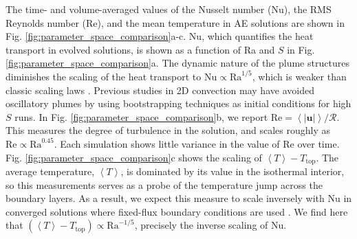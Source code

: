 \documentclass[aps, pre, onecolumn, nofootinbib, notitlepage, groupedaddress, amsfonts, amssymb, amsmath, longbibliography]{revtex4-1}
\newcommand{\angles}[1]{\ensuremath{\left\langle #1 \right\rangle}}
\begin{document}
The time- and volume-averaged values of the Nusselt number (Nu), the RMS
Reynolds number (Re), and the mean temperature in AE solutions 
are shown in Fig. \ref{fig:parameter_space_comparison}a-c.
Nu, which quantifies the heat transport in evolved solutions,
is shown as a function of Ra and $S$ in Fig. \ref{fig:parameter_space_comparison}a.
The
dynamic nature of the plume structures diminishes the
scaling of the heat transport to $\text{Nu} \propto \text{Ra}^{1/5}$,
which is weaker than classic scaling laws \cite{johnston&doering2009, ahlers&all2009}.
Previous studies in 2D convection may have avoided oscillatory plumes by using
bootstrapping techniques as initial conditions for high $S$ runs.
In Fig. \ref{fig:parameter_space_comparison}b, we report 
$\text{Re} = \angles{|\bm{u}|} / \mathcal{R}$.  This measures the degree of
turbulence in the solution, and scales roughly as
$\text{Re} \propto \text{Ra}^{0.45}$. Each simulation shows little variance in
the value of Re over time.
Fig. \ref{fig:parameter_space_comparison}c shows the scaling of $\angles{T} - T_{\text{top}}$.
The average temperature, $\angles{T}$, is dominated by its value in the isothermal interior,
so this measurements serves as a probe of the temperature jump across the boundary
layers. As a result, we expect this measure to
scale inversely with Nu in converged solutions
where fixed-flux boundary conditions are used \cite{otero&all2002}.  We find here
that $(\angles{T} - T_{\text{top}}) \propto \text{Ra}^{-1/5}$, precisely the inverse
scaling of Nu.
\end{document}
